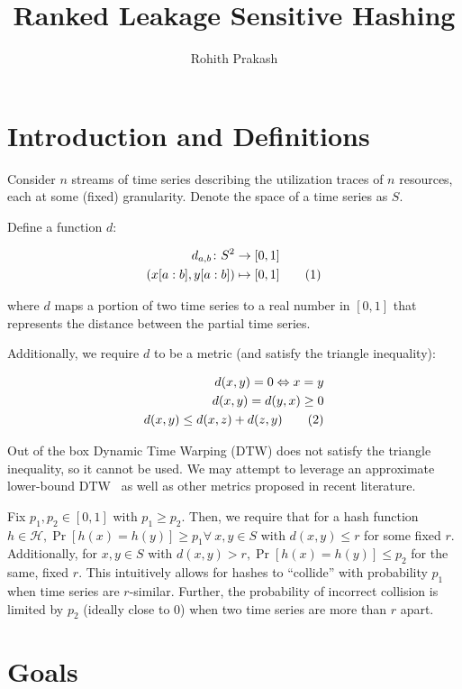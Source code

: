 \documentclass{article}
\title{Ranked Leakage Sensitive Hashing}
\author{Rohith Prakash}
\date{}
\newcommand\numberthis{\addtocounter{equation}{1}\tag{\theequation}}
\begin{document}
\maketitle{}

\section{Introduction and Definitions}
Consider $n$ streams of time series describing the utilization traces of $n$ resources, each at some (fixed) granularity.
Denote the space of a time series as $S$.

Define a function $d$:

\begin{align*}
    d_{a,b} \colon S^2 &\to [0,1]\\
    (x[a:b],y[a:b]) &\mapsto [0,1] \numberthis
\end{align*}

where $d$ maps a portion of two time series to a real number in $[0,1]$ that represents the distance between the partial time series.

Additionally, we require $d$ to be a metric (and satisfy the triangle inequality):

\begin{align*}
    d(x,y) = 0 \Leftrightarrow x = y \\
    d(x,y) = d(y,x) \ge 0 \\
    d(x,y) \le d(x,z) + d(z,y) \numberthis
\end{align*}

Out of the box Dynamic Time Warping (DTW) does not satisfy the triangle inequality, so it cannot be used.
We may attempt to leverage an approximate lower-bound DTW~\cite{Lemire09-DTW} as well as other metrics proposed in recent literature.

Fix $p_1, p_2 \in [0,1]$ with $p_1 \ge p_2$.
Then, we require that for a hash function $h \in \mathcal{H}, \Pr[h(x) = h(y)] \ge p_1 \forall~x,y \in S$ with $d(x,y) \le r$ for some fixed $r$.
Additionally, for $x,y \in S$ with $d(x,y) > r, \Pr[h(x) = h(y)] \le p_2$ for the same, fixed $r$.
This intuitively allows for hashes to ``collide'' with probability $p_1$ when time series are $r$-similar.
Further, the probability of incorrect collision is limited by $p_2$ (ideally close to $0$) when two time series are more than $r$ apart.

\section{Goals}
\end{document}
